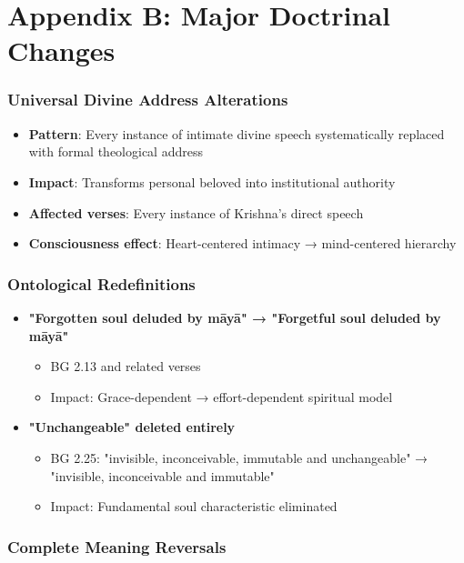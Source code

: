 \documentclass[11pt,twoside]{book}
\begin{document}
\part*{Appendix B: Major Doctrinal Changes}
\label{sec:org6e489d1}
\thispagestyle{plain}
\section*{Universal Divine Address Alterations}
\label{sec:org7c3aca6}
\begin{itemize}
\item \textbf{\textbf{Pattern}}: Every instance of intimate divine speech systematically replaced with formal theological address
\item \textbf{\textbf{Impact}}: Transforms personal beloved into institutional authority
\item \textbf{\textbf{Affected verses}}: Every instance of Krishna's direct speech
\item \textbf{\textbf{Consciousness effect}}: Heart-centered intimacy → mind-centered hierarchy
\end{itemize}
\section*{Ontological Redefinitions}
\label{sec:orga1ddd67}
\begin{itemize}
\item \textbf{\textbf{"Forgotten soul deluded by māyā" → "Forgetful soul deluded by māyā"}}
\begin{itemize}
\item BG 2.13 and related verses
\item Impact: Grace-dependent → effort-dependent spiritual model
\end{itemize}

\item \textbf{\textbf{"Unchangeable" deleted entirely}}
\begin{itemize}
\item BG 2.25: "invisible, inconceivable, immutable and unchangeable" → "invisible, inconceivable and immutable"
\item Impact: Fundamental soul characteristic eliminated
\end{itemize}
\end{itemize}
\section*{Complete Meaning Reversals}
\label{sec:orge3a116a}
\end{document}
